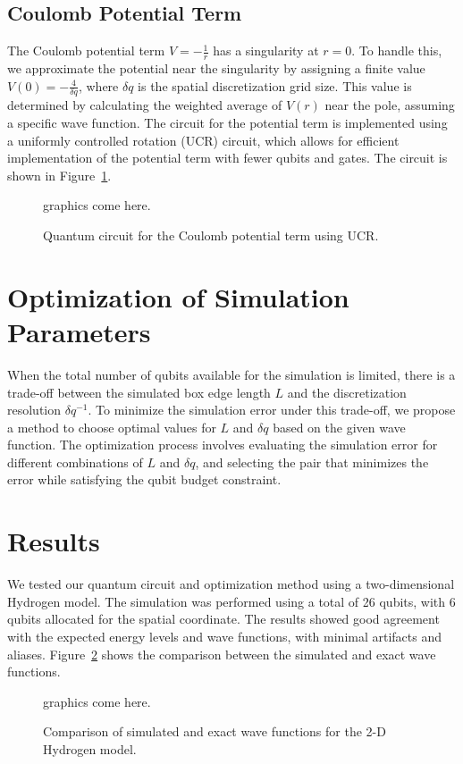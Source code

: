 \documentclass[A4]{article}
\begin{document}
\subsection{Coulomb Potential Term}
The Coulomb potential term $V = -\frac{1}{r}$ has a singularity at $r=0$. To handle this,
we approximate the potential near the singularity by assigning a finite value
$V(0) = -\frac{4}{\delta q}$, where $\delta q$ is the spatial discretization grid size. This value is
determined by calculating the weighted average of $V(r)$ near the pole, assuming a specific wave function.
The circuit for the potential term is implemented using a uniformly controlled
rotation (UCR) circuit, which allows for efficient implementation of the potential
term with fewer qubits and gates. The circuit is shown in Figure~\ref{fig:potential}.
\begin{figure}[h]
\centering
graphics come here.
\caption{Quantum circuit for the Coulomb potential term using UCR.}
\label{fig:potential}
\end{figure}
\section{Optimization of Simulation Parameters}
When the total number of qubits available for the simulation is limited, there
is a trade-off between the simulated box edge length $L$ and the discretization
resolution $\delta q^{-1}$. To minimize the simulation error under this trade-off, we propose a method to choose optimal values for $L$ and $\delta q$ based on the
given wave function. The optimization process involves evaluating the simulation
error for different combinations of $L$ and $\delta q$, and selecting the pair
that minimizes the error while satisfying the qubit budget constraint.
\section{Results}
We tested our quantum circuit and optimization method using a two-dimensional
Hydrogen model. The simulation was performed using a total of 26 qubits, with
6 qubits allocated for the spatial coordinate. The results showed good agreement
with the expected energy levels and wave functions, with minimal artifacts and
aliases. Figure~\ref{fig:results} shows the comparison between the simulated and
exact wave functions.
\begin{figure}[h]
\centering
graphics come here.
\caption{Comparison of simulated and exact wave functions for the 2-D Hydrogen model.}
\label{fig:results}
\end{figure}
\end{document}

